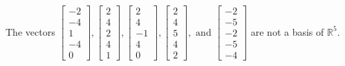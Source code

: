 \begin{exercise}
\begin{exerciseStatement}
  \end{exerciseStatement}
  \begin{exerciseAnswer}
   The vectors \(\left[\begin{array}{r}
-2 \\
-4 \\
1 \\
-4 \\
0
\end{array}\right] , \left[\begin{array}{r}
2 \\
4 \\
2 \\
4 \\
1
\end{array}\right] , \left[\begin{array}{r}
2 \\
4 \\
-1 \\
4 \\
0
\end{array}\right] , \left[\begin{array}{r}
2 \\
4 \\
5 \\
4 \\
2
\end{array}\right] , \text{ and } \left[\begin{array}{r}
-2 \\
-5 \\
-2 \\
-5 \\
-4
\end{array}\right]\) 
  	 are not  a basis of \(\mathbb{R}^5\).
  


  \end{exerciseAnswer}
\end{exercise}